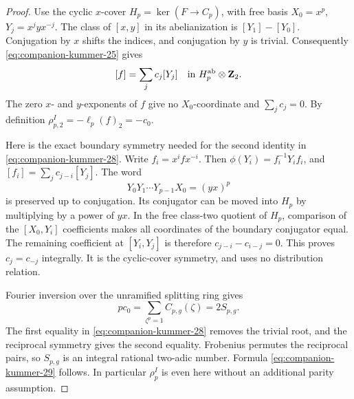 \begin{proof}
Use the cyclic \(x\)-cover
\(H_p=\ker(F\to C_p)\), with free basis
\(X_0=x^p\), \(Y_j=x^jyx^{-j}\). The class of \([x,y]\)
in its abelianization is \([Y_1]-[Y_0]\). Conjugation by \(x\)
shifts the indices, and conjugation by \(y\) is trivial.
Consequently \eqref{eq:companion-kummer-25} gives
\[
                    [f]=\sum_j c_j[Y_j]
                  \quad\hbox{in }H_p^{\mathrm{ab}}\otimes\mathbf Z_2.
\]
The zero \(x\)- and \(y\)-exponents of \(f\) give no
\(X_0\)-coordinate and \(\sum_jc_j=0\). By definition
\(\rho_{p,2}^I=-\ell_p(f)_2=-c_0\).

Here is the exact boundary symmetry needed for the second identity
in \eqref{eq:companion-kummer-28}. Write \(f_i=x^ifx^{-i}\). Then
\(\phi(Y_i)=f_i^{-1}Y_if_i\), and
\([f_i]=\sum_jc_{j-i}[Y_j]\). The word
\[
                      Y_0Y_1\cdots Y_{p-1}X_0=(yx)^p
\]
is preserved up to conjugation. Its conjugator can be moved into
\(H_p\) by multiplying by a power of \(yx\). In the free class-two
quotient of \(H_p\), comparison of the \([X_0,Y_i]\) coefficients
makes all coordinates of the boundary conjugator equal. The
remaining coefficient at \([Y_i,Y_j]\) is therefore
\(c_{j-i}-c_{i-j}=0\). This proves \(c_j=c_{-j}\) integrally.
It is the cyclic-cover symmetry, and uses no distribution relation.

Fourier inversion over the unramified splitting ring gives
\[
       p c_0=\sum_{\zeta^p=1}C_{p,g}(\zeta)=2S_{p,g}.
\]
The first equality in \eqref{eq:companion-kummer-28} removes the trivial root, and the
reciprocal symmetry gives the second equality. Frobenius permutes
the reciprocal pairs, so \(S_{p,g}\) is an integral rational
two-adic number. Formula \eqref{eq:companion-kummer-29} follows. In particular \(\rho_p^I\)
is even here without an additional parity assumption.
\end{proof}

